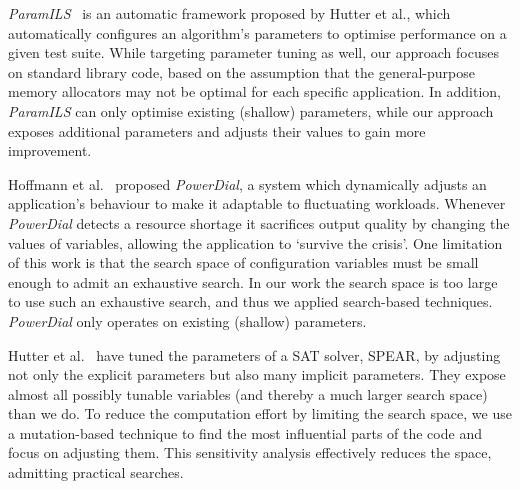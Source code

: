 \emph{ParamILS}~\cite{hutter2009paramils} is an automatic framework proposed by Hutter et al.,
which automatically configures an algorithm's parameters to optimise
performance on a given test suite. 
While
targeting parameter tuning as well, our approach focuses on standard
library code, based on the assumption that the general-purpose memory
allocators may not be optimal for each specific application. In addition,
\emph{ParamILS} can only optimise existing (shallow) parameters, while our
approach exposes additional parameters and adjusts their values to gain more
improvement.

Hoffmann et al.~\cite{Hoffmann:2011:DKR:1950365.1950390} proposed
\emph{PowerDial}, a system which dynamically adjusts an application's
behaviour to make it adaptable to fluctuating workloads. 
Whenever \emph{PowerDial} detects a resource shortage it sacrifices 
output quality by changing the values of variables, allowing
the application to `survive the crisis'. One limitation of
this work is that the search space of configuration variables must be small
enough to admit an exhaustive search. In our work the search space is too
large to use such an exhaustive search, and thus we applied search-based
techniques. %
\emph{PowerDial} only operates
on existing (shallow) parameters. 

Hutter et al.~\cite{4401979} have tuned the parameters of a SAT
solver, SPEAR, by adjusting not only the explicit parameters but also many
implicit parameters. They expose almost all possibly tunable variables 
(and
thereby a much larger search space) than we do. 
To reduce the
computation effort by limiting the search space, we use a mutation-based
technique to find the most influential parts of the code and focus
on adjusting them. 
This sensitivity analysis effectively reduces the 
space, admitting practical searches.

